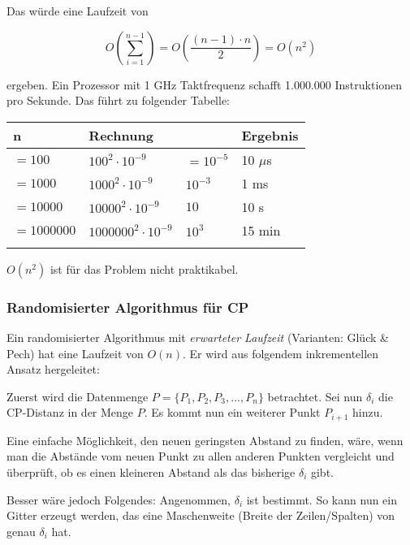 \documentclass{scrartcl}%
\begin{document}
    Das würde eine Laufzeit von

    \begin{equation*}
        O\left(\sum_{i=1}^{n-1}\right) = O\left( \frac{(n-1) \cdot n}{2} \right) = O(n^2)
    \end{equation*}

    ergeben.
    Ein Prozessor mit 1 GHz Taktfrequenz schafft
    1.000.000 Instruktionen pro Sekunde.
    Das führt zu folgender Tabelle:
    \begin{table}[!ht]
        \centering
        \begin{tabular}{llll}
            \textbf{\textsf{n}} & \textbf{\textsf{Rechnung}} & & \textbf{\textsf{Ergebnis}}\\
            \hline
            $=100       $ & $100^2 \cdot 10^{-9}$       & $=10^{-5}$   & 10 $\mu$s \\
            $=1000      $ & $1000^2 \cdot 10^{-9}$      & $10^{-3}$    & 1 ms \\
            $=10000     $ & $10000^2 \cdot 10^{-9}$     & $10$         & 10 s \\
            $=1000000   $ & $1000000^2 \cdot 10^{-9}$   & $10^3$       & 15 min \\
            \hline \\
        \end{tabular}
    \end{table}
    $O(n^2)$ ist für das Problem nicht praktikabel.

    \subsubsection*{Randomisierter Algorithmus für CP}
    \label{subsec:randomisierterAlgorithmusfürCP}

    Ein randomisierter Algorithmus mit \textit{erwarteter Laufzeit}
    (Varianten: Glück & Pech) hat eine Laufzeit von $O(n)$.
    Er wird aus folgendem inkrementellen Ansatz hergeleitet:

    Zuerst wird die Datenmenge $P = \{ P_1, P_2, P_3, ..., P_n \}$ betrachtet.
    Sei nun $\delta_i$ die CP-Distanz in der Menge $P$.
    Es kommt nun ein weiterer Punkt $P_{i+1}$ hinzu.

    Eine einfache Möglichkeit, den neuen geringsten Abstand zu finden, wäre,
    wenn man die Abstände vom neuen Punkt zu allen anderen Punkten vergleicht und überprüft,
    ob es einen kleineren Abstand als das bisherige $\delta_i$ gibt.

    Besser wäre jedoch Folgendes: Angenommen, $\delta_i$ ist bestimmt.
    So kann nun ein Gitter erzeugt werden, das eine Maschenweite
    (Breite der Zeilen/Spalten) von genau $\delta_i$ hat.
\end{document}
